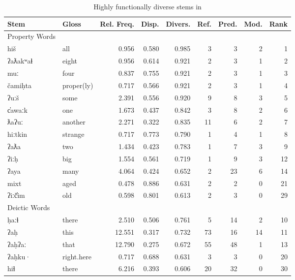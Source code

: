 \begin{table}
  \centering
  \caption{Highly functionally diverse stems in }
  \label{tab:Nuuchahnulth-high-functional-diversity}
  \begin{tabular}{ l l r r r r r r r }
    \toprule
    Stem & Gloss & Rel. Freq. & Disp. & Divers. & Ref. & Pred. & Mod. & Rank\\

    \midrule
    Property Words\\
    \midrule
    hiš      & all        & 0.956 & 0.580 & 0.985 &  3 &  3 & 2 &  1\\
    ʔaƛakʷaɬ & eight      & 0.956 & 0.614 & 0.921 &  2 &  3 & 1 &  2\\
    muː      & four       & 0.837 & 0.755 & 0.921 &  2 &  3 & 1 &  3\\
    čamiḥta  & proper(ly) & 0.717 & 0.566 & 0.921 &  2 &  3 & 1 &  4\\
    ʔuːš     & some       & 2.391 & 0.556 & 0.920 &  9 &  8 & 3 &  5\\
    c̓awaːk   & one        & 1.673 & 0.437 & 0.842 &  3 &  8 & 2 &  6\\
    ƛaʔuː    & another    & 2.271 & 0.322 & 0.835 & 11 &  6 & 2 &  7\\
    hiːtkin  & strange    & 0.717 & 0.773 & 0.790 &  1 &  4 & 1 &  8\\
    ʔaƛa     & two        & 1.434 & 0.423 & 0.783 &  1 &  7 & 3 &  9\\
    ʔiːḥ     & big        & 1.554 & 0.561 & 0.719 &  1 &  9 & 3 & 12\\
    ʔaya     & many       & 4.064 & 0.424 & 0.652 &  2 & 23 & 6 & 14\\
    mixt     & aged       & 0.478 & 0.886 & 0.631 &  2 &  2 & 0 & 21\\
    ʔiːč̓im   & old        & 0.598 & 0.801 & 0.613 &  2 &  3 & 0 & 29\\

    \midrule
    Deictic Words\\
    \midrule
    ḥaːɬ   & there      &  2.510 & 0.506 & 0.761 &  5 & 14 &  2 & 10\\
    ʔaḥ    & this       & 12.551 & 0.317 & 0.732 & 73 & 16 & 14 & 11\\
    ʔaḥʔaː & that       & 12.790 & 0.275 & 0.672 & 55 & 48 &  1 & 13\\
    ʔaḥku· & right.here &  0.717 & 0.688 & 0.631 &  3 &  3 &  0 & 20\\
    hiɬ    & there      &  6.216 & 0.393 & 0.606 & 20 & 32 &  0 & 30\\

    \bottomrule
  \end{tabular}
\end{table}


